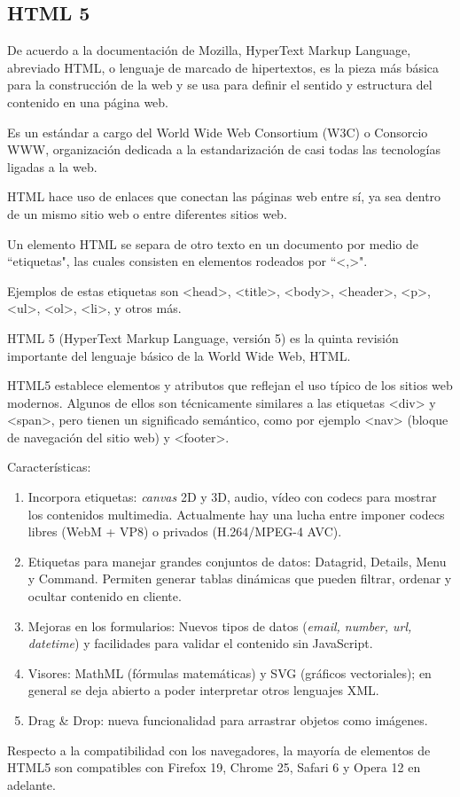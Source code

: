 \subsection{HTML 5 }

De acuerdo a la documentación de Mozilla\cite{noauthor_html_nodate}, HyperText Markup Language, abreviado HTML, o lenguaje de marcado de hipertextos, es la pieza más básica para la construcción de la web y se usa para definir el sentido y estructura del contenido en una página web. 


Es un estándar a cargo del World Wide Web Consortium (W3C) o Consorcio WWW, organización dedicada a la estandarización de casi todas las tecnologías ligadas a la web. 


HTML hace uso de enlaces que conectan las páginas web entre sí, ya sea dentro de un mismo sitio web o entre diferentes sitios web.


Un elemento HTML se separa de otro texto en un documento por medio de ``etiquetas", las cuales consisten en elementos rodeados por ``<,>".


Ejemplos de estas etiquetas son <head>, <title>, <body>, <header>, <p>, <ul>, <ol>, <li>, y otros más.


HTML 5 (HyperText Markup Language, versión 5) es la quinta revisión importante del lenguaje básico de la World Wide Web, HTML.


HTML5 establece elementos y atributos que reflejan el uso típico de los sitios web modernos. Algunos de ellos son técnicamente similares a las etiquetas <div> y <span>, pero tienen un significado semántico, como por ejemplo <nav> (bloque de navegación del sitio web) y <footer>.


Características:

\begin{enumerate}
    \item Incorpora etiquetas: \textit{canvas} 2D y 3D, audio, vídeo con codecs para mostrar los contenidos multimedia. Actualmente hay una lucha entre imponer codecs libres (WebM + VP8) o privados (H.264/MPEG-4 AVC).
    \item Etiquetas para manejar grandes conjuntos de datos: Datagrid, Details, Menu y Command. Permiten generar tablas dinámicas que pueden filtrar, ordenar y ocultar contenido en cliente.
    \item Mejoras en los formularios: Nuevos tipos de datos (\textit{email, number, url, datetime})  y facilidades para validar el contenido sin JavaScript.
    \item Visores: MathML (fórmulas matemáticas) y SVG (gráficos vectoriales); en general se deja abierto a poder interpretar otros lenguajes XML.
    \item Drag \& Drop: nueva funcionalidad para arrastrar objetos como imágenes.
\end{enumerate}

Respecto a la compatibilidad con los navegadores, la mayoría de elementos de HTML5 son compatibles con Firefox 19, Chrome 25, Safari 6 y Opera 12 en adelante.

